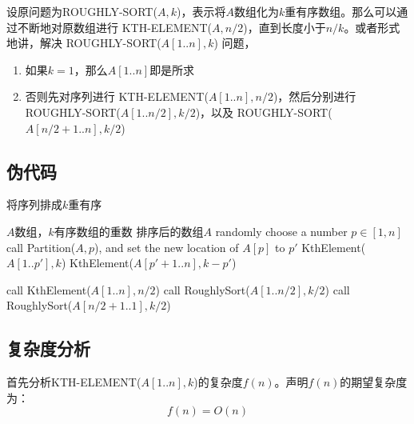\documentclass[UTF8]{ctexart}
\begin{document}
设原问题为ROUGHLY-SORT($A, k$)，表示将$A$数组化为$k$重有序数组。那么可以通过不断地对原数组进行 KTH-ELEMENT($A, n/2$)，直到长度小于$n/k$。或者形式地讲，解决 ROUGHLY-SORT($A[1..n], k$) 问题，
\begin{enumerate}
    \item 如果$k = 1$，那么$A[1..n]$即是所求
    \item 否则先对序列进行 KTH-ELEMENT($A[1..n], n/2$)，然后分别进行 ROUGHLY-SORT($A[1..n/2], k/2$)，以及 ROUGHLY-SORT($A[n/2+1..n], k/2$)
\end{enumerate}

\subsection*{伪代码}
\begin{algorithm}
    \caption{将序列排成$k$重有序}
    \begin{algorithmic}[1]
        \Require $A$数组，$k$有序数组的重数
        \Ensure 排序后的数组$A$
            \State randomly choose a number $p \in [1, n]$
            \State call Partition($A, p$), and set the new location of $A[p]$ to $p'$
                \State KthElement($A[1..p'], k$)
            \Else
                \State KthElement($A[p'+1..n], k-p'$)
            \EndIf
        \EndFunction

                \State \Return
            \Else
                \State call KthElement($A[1..n], n/2$)
                \State call RoughlySort($A[1..n/2], k/2$)
                \State call RoughlySort($A[n/2+1..1], k/2$)
            \EndIf
        \EndFunction
    \end{algorithmic}
\end{algorithm}

\subsection*{复杂度分析}
首先分析KTH-ELEMENT($A[1..n], k$)的复杂度$f(n)$。声明$f(n)$的期望复杂度为：
$$f(n) = O(n)$$
\end{document}
